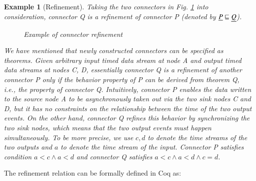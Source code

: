\documentclass[preprint,3p]{elsarticle}
\newtheorem{example}{Example}[section]
\newtheorem{theorem}{Theorem}[section]
\begin{document}
\begin{example}[Refinement]
\label{ex:refine}
Taking the two connectors in Fig. \ref{refine} into consideration, connector \emph{Q} is a refinement of connector \emph{P} (denoted by $\emph{P} \sqsubseteq \emph{Q}$).
\begin{figure}
\vspace{0cm}
\centering
{}
\caption{Example of connector refinement}
\label{refine}
\end{figure}

We have mentioned that newly constructed connectors can be specified as theorems. Given arbitrary input timed
data stream at node \emph{A} and output timed data streams at nodes \emph{C}, \emph{D}, essentially connector
\emph{Q} is a refinement of another connector \emph{P} only if the behavior property of \emph{P} can
be derived from \emph{theorem Q}, i.e., the property of connector \emph{Q}. Intuitively, connector \emph{P} enables the
data written to the source node \emph{A} to be asynchronously taken out via the two sink nodes \emph{C} and \emph{D}, but
it has no constraints on the relationship between the time of the two output events. On the other hand,
connector \emph{Q} refines this behavior by synchronizing the two sink nodes, which means that the two output
events must happen simultaneously. To be more precise, we use $c,d$ to denote the time streams of the two outputs
and $a$ to denote the time stream of the input. Connector \emph{P} satisfies condition $a<c\wedge a<d$ and
connector \emph{Q} satisfies $a<c\wedge a<d \wedge c=d$.
\end{example}

The refinement relation can be formally defined in Coq as:

\end{document}
